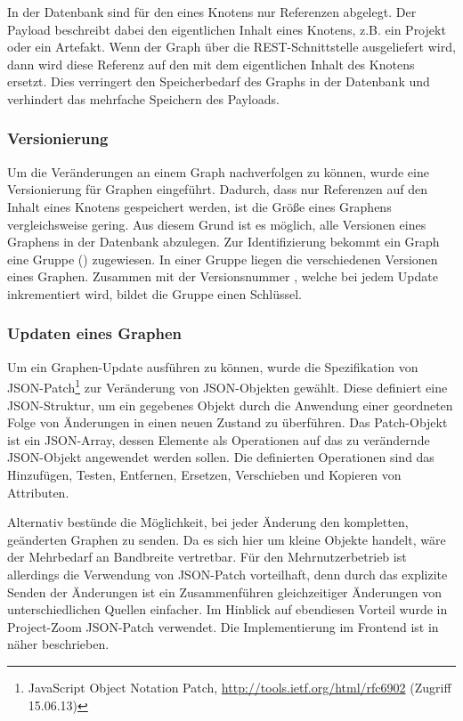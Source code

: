In der Datenbank sind für den  eines Knotens nur Referenzen abgelegt. Der Payload beschreibt dabei den eigentlichen Inhalt eines Knotens, z.B. ein Projekt oder ein \gls{Artefakt}. Wenn der Graph über die REST-Schnittstelle ausgeliefert wird, dann wird diese Referenz auf den  mit dem eigentlichen Inhalt des Knotens ersetzt. Dies verringert den Speicherbedarf des Graphs in der Datenbank und verhindert das mehrfache Speichern des Payloads.

\subsubsection{Versionierung}

Um die Veränderungen an einem Graph nachverfolgen zu können, wurde eine Versionierung für Graphen eingeführt. Dadurch, dass nur Referenzen auf den Inhalt eines Knotens gespeichert werden, ist die Größe eines Graphens vergleichsweise gering. Aus diesem Grund ist es möglich, alle Versionen eines Graphens in der Datenbank abzulegen. Zur Identifizierung bekommt ein Graph eine Gruppe () zugewiesen. In einer Gruppe liegen die verschiedenen Versionen eines Graphen. Zusammen mit der Versionsnummer , welche bei jedem Update inkrementiert wird, bildet die Gruppe einen Schlüssel.

\subsubsection{Updaten eines Graphen}

Um ein Graphen-Update ausführen zu können, wurde die Spezifikation von JSON-Patch\footnote{JavaScript Object Notation Patch, \url{http://tools.ietf.org/html/rfc6902} (Zugriff 15.06.13)} zur Veränderung von JSON-Objekten gewählt. Diese definiert eine JSON-Struktur, um ein gegebenes Objekt durch die Anwendung einer geordneten Folge von Änderungen in einen neuen Zustand zu überführen. Das Patch-Objekt ist ein JSON-Array, dessen Elemente als Operationen auf das zu verändernde JSON-Objekt angewendet werden sollen. Die definierten Operationen sind das Hinzufügen, Testen, Entfernen, Ersetzen, Verschieben und Kopieren von Attributen.

Alternativ bestünde die Möglichkeit, bei jeder Änderung den kompletten, geänderten Graphen zu senden. Da es sich hier um kleine Objekte handelt, wäre der Mehrbedarf an Bandbreite vertretbar. Für den Mehrnutzerbetrieb ist allerdings die Verwendung von JSON-Patch vorteilhaft, denn durch das explizite Senden der Änderungen ist ein Zusammenführen gleichzeitiger Änderungen von unterschiedlichen Quellen einfacher. Im Hinblick auf ebendiesen Vorteil wurde in Project-Zoom JSON-Patch verwendet. Die Implementierung im \gls{Frontend} ist in \cite{bp-norman} näher beschrieben.

